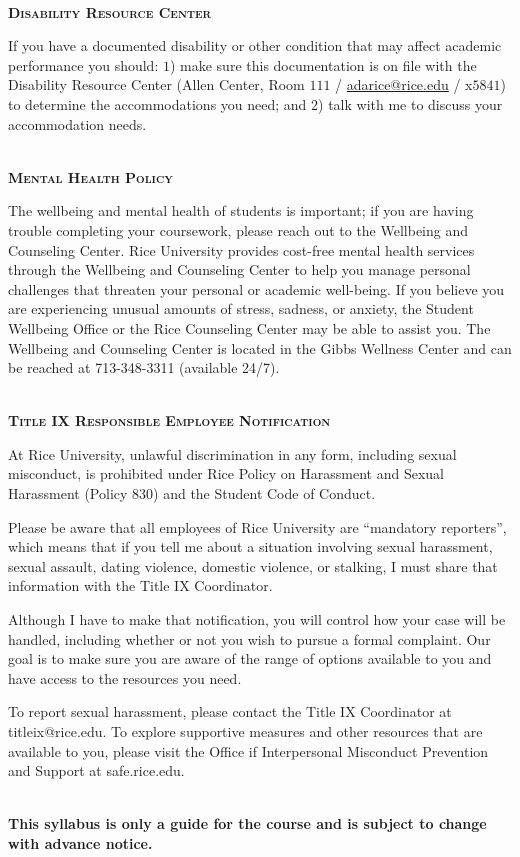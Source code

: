 \documentclass[11pt]{article}
\begin{document}
~\\
\textbf{\textsc{Disability Resource Center}}
\begin{adjustwidth}{1cm}{0cm}
  If you have a documented disability or other condition that may affect academic performance you should: $1$) make sure this documentation is on file with the Disability Resource Center (Allen Center, Room $111$ / \href{mailto:adarice@rice.edu}{adarice@rice.edu} / x$5841$) to determine the accommodations you need; and $2$) talk with me to discuss your accommodation needs.
\end{adjustwidth}

~\\
\textbf{\textsc{Mental Health Policy}}
\begin{adjustwidth}{1cm}{0cm}
	The wellbeing and mental health of students is important; if you are having trouble completing your coursework, please reach out to the Wellbeing and Counseling Center. Rice University provides cost-free mental health services through the Wellbeing and Counseling Center to help you manage personal challenges that threaten your personal or academic well-being. If you believe you are experiencing unusual amounts of stress, sadness, or anxiety, the Student Wellbeing Office or the Rice Counseling Center may be able to assist you. The Wellbeing and Counseling Center is located in the Gibbs Wellness Center and can be reached at 713-348-3311 (available 24/7).
\end{adjustwidth}

~\\
\textbf{\textsc{Title IX Responsible Employee Notification}}
\begin{adjustwidth}{1cm}{0cm}
  At Rice University, unlawful discrimination in any form, including sexual misconduct, is prohibited under Rice Policy on Harassment and Sexual Harassment (Policy 830) and the Student Code of Conduct.

  Please be aware that all employees of Rice University are ``mandatory reporters'', which means that if you tell me about a situation involving sexual harassment, sexual assault, dating violence, domestic violence, or stalking, I must share that information with the Title IX Coordinator.

  Although I have to make that notification, you will control how your case will be handled, including whether or not you wish to pursue a formal complaint. Our goal is to make sure you are aware of the range of options available to you and have access to the resources you need.

  To report sexual harassment, please contact the Title IX Coordinator at titleix@rice.edu. To explore supportive measures and other resources that are available to you, please visit the Office if Interpersonal Misconduct Prevention and Support at safe.rice.edu.
\end{adjustwidth}

~\\
\textbf{This syllabus is only a guide for the course and is subject to change with advance notice.}
\end{document}
